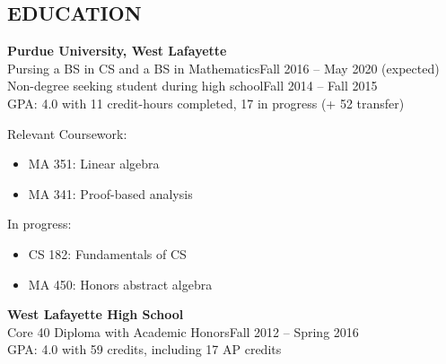 \documentclass[line,margin]{res}
\begin{document}
\begin{resume}



  \section{EDUCATION}
  {\bf\rmfamily Purdue University, West Lafayette}\\
  Pursing a BS in CS and a BS in Mathematics\hfill Fall 2016 -- May 2020 (expected)\\
  Non-degree seeking student during high school\hfill Fall 2014 -- Fall 2015\\
  GPA: 4.0 with 11 credit-hours completed, 17 in progress (+ 52 transfer)
  \multicolsep 0pt
  \begin{multicols}{2}
  Relevant Coursework:
  \begin{itemize} \itemsep -2pt
  \item MA 351: Linear algebra
  \item MA 341: Proof-based analysis
  \end{itemize}
  In progress:
  \begin{itemize} \itemsep -2pt
  \item CS 182: Fundamentals of CS
  \item MA 450: Honors abstract algebra
  \end{itemize}
  \end{multicols}


  {\bf\rmfamily West Lafayette High School}\\
  Core 40 Diploma with Academic Honors\hfill Fall 2012 -- Spring 2016\\
  GPA: 4.0 with 59 credits, including 17 AP credits%



\end{resume}
\end{document}
